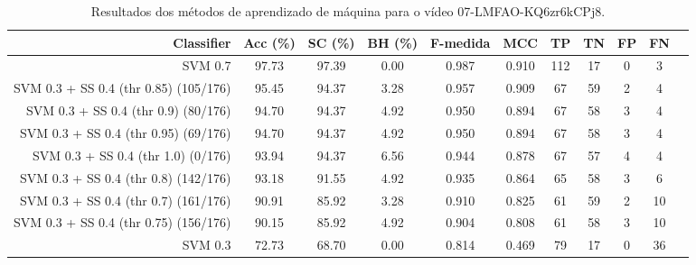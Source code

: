 \begin{table}[!htb]
\centering
\caption{Resultados dos métodos de aprendizado de máquina para o vídeo 07-LMFAO-KQ6zr6kCPj8.}
\label{tab:07-LMFAO-KQ6zr6kCPj8}
\begin{tabular}{r|c|c|c|c|c|c|c|c|c|c}
\hline\hline
Classifier & Acc (\%) & SC (\%) & BH (\%) & F-medida & MCC & TP & TN & FP & FN \\ \hline
SVM 0.7 & 97.73 & 97.39 & 0.00 & 0.987 & 0.910 & 112 & 17 & 0 & 3 \\ 
SVM 0.3 + SS 0.4 (thr 0.85) (105/176) & 95.45 & 94.37 & 3.28 & 0.957 & 0.909 & 67 & 59 & 2 & 4 \\ 
SVM 0.3 + SS 0.4 (thr 0.9) (80/176) & 94.70 & 94.37 & 4.92 & 0.950 & 0.894 & 67 & 58 & 3 & 4 \\ 
SVM 0.3 + SS 0.4 (thr 0.95) (69/176) & 94.70 & 94.37 & 4.92 & 0.950 & 0.894 & 67 & 58 & 3 & 4 \\ 
SVM 0.3 + SS 0.4 (thr 1.0) (0/176) & 93.94 & 94.37 & 6.56 & 0.944 & 0.878 & 67 & 57 & 4 & 4 \\ 
SVM 0.3 + SS 0.4 (thr 0.8) (142/176) & 93.18 & 91.55 & 4.92 & 0.935 & 0.864 & 65 & 58 & 3 & 6 \\ 
SVM 0.3 + SS 0.4 (thr 0.7) (161/176) & 90.91 & 85.92 & 3.28 & 0.910 & 0.825 & 61 & 59 & 2 & 10 \\ 
SVM 0.3 + SS 0.4 (thr 0.75) (156/176) & 90.15 & 85.92 & 4.92 & 0.904 & 0.808 & 61 & 58 & 3 & 10 \\ 
SVM 0.3 & 72.73 & 68.70 & 0.00 & 0.814 & 0.469 & 79 & 17 & 0 & 36 \\ 
\hline\hline
\end{tabular}
\end{table}
